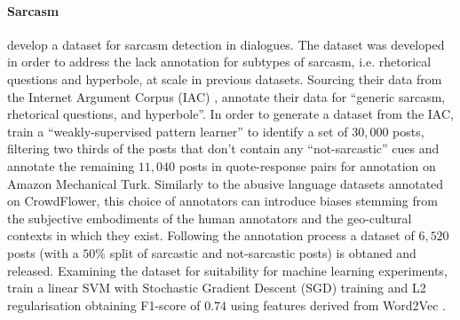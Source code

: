 \paragraph*{Sarcasm} \citet{Oraby_sarcasm:2016} develop a dataset for sarcasm detection in dialogues. The dataset was developed in order to address the lack annotation for subtypes of sarcasm, i.e. rhetorical questions and hyperbole, at scale in previous datasets.
Sourcing their data from the Internet Argument Corpus (IAC) \citep{Abbott:2016}, \citet{Oraby_sarcasm:2016} annotate their data for ``generic sarcasm, rhetorical questions, and hyperbole''.
In order to generate a dataset from the IAC, \citet{Oraby_sarcasm:2016} train a ``weakly-supervised pattern learner'' \citep{Oraby_sarcasm:2016} to identify a set of $30,000$ posts, filtering two thirds of the posts that don't contain any ``not-sarcastic'' cues and annotate the remaining $11,040$ posts in quote-response pairs for annotation on Amazon Mechanical Turk.
Similarly to the abusive language datasets annotated on CrowdFlower, this choice of annotators can introduce biases stemming from the subjective embodiments of the human annotators and the geo-cultural contexts in which they exist.
Following the annotation process a dataset of $6,520$ posts (with a $50\%$ split of sarcastic and not-sarcastic posts) is obtaned and released.
Examining the dataset for suitability for machine learning experiments, \citet{Oraby_sarcasm:2016} train a linear SVM with Stochastic Gradient Descent (SGD) training and L2 regularisation obtaining F1-score of $0.74$ using features derived from Word2Vec \citep{Mikolov:2013}.

